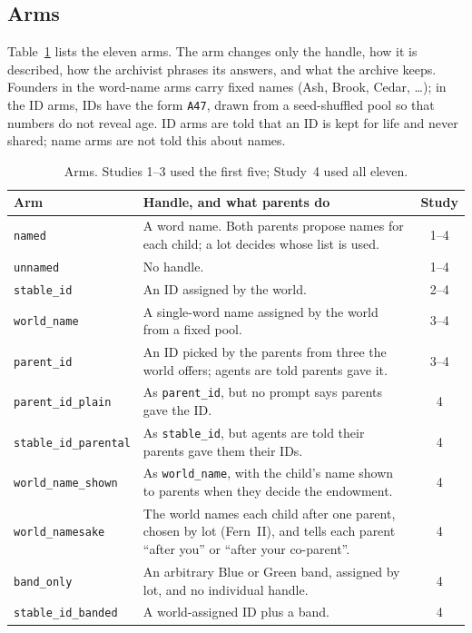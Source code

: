 \documentclass[11pt]{article}
\newcommand{\arm}[1]{\texttt{#1}}
\begin{document}
\subsection{Arms}

Table~\ref{tab:arms} lists the eleven arms. The arm changes only the handle, how it is described,
how the archivist phrases its answers, and what the archive keeps. Founders in the word-name arms
carry fixed names (Ash, Brook, Cedar, \ldots); in the ID arms, IDs have the form \texttt{A47},
drawn from a seed-shuffled pool so that numbers do not reveal age. ID arms are told that an ID is
kept for life and never shared; name arms are not told this about names.

\begin{table}[t]
\centering
\small
\caption{Arms. Studies 1--3 used the first five; Study~4 used all eleven.}
\label{tab:arms}
\begin{tabularx}{\linewidth}{@{}l X c@{}}
\toprule
Arm & Handle, and what parents do & Study \\
\midrule
\arm{named} & A word name. Both parents propose names for each child; a lot decides whose list is used. & 1--4 \\
\arm{unnamed} & No handle. & 1--4 \\
\arm{stable\_id} & An ID assigned by the world. & 2--4 \\
\arm{world\_name} & A single-word name assigned by the world from a fixed pool. & 3--4 \\
\arm{parent\_id} & An ID picked by the parents from three the world offers; agents are told parents gave it. & 3--4 \\
\midrule
\arm{parent\_id\_plain} & As \arm{parent\_id}, but no prompt says parents gave the ID. & 4 \\
\arm{stable\_id\_parental} & As \arm{stable\_id}, but agents are told their parents gave them their IDs. & 4 \\
\arm{world\_name\_shown} & As \arm{world\_name}, with the child's name shown to parents when they decide the endowment. & 4 \\
\arm{world\_namesake} & The world names each child after one parent, chosen by lot (Fern~II), and tells each parent ``after you'' or ``after your co-parent''. & 4 \\
\arm{band\_only} & An arbitrary Blue or Green band, assigned by lot, and no individual handle. & 4 \\
\arm{stable\_id\_banded} & A world-assigned ID plus a band. & 4 \\
\bottomrule
\end{tabularx}
\end{table}
\end{document}
